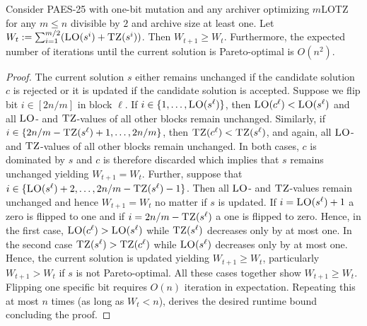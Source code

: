 \documentclass[
sigconf = false, %
review = false, %
screen = true, %
anonymous = true, %
format=acmsmall
]{acmart}
\newcommand{\mLOTZ}{\ensuremath{m}\text{-}\textsc{LOTZ}\xspace}
\newcommand{\LO}{\textsc{LO}\xspace}                      %
\newcommand{\TZ}{\textsc{TZ}\xspace}
\newcommand{\PAES}{PAES-25\xspace}
\newcommand{\nbc}[3]{
		{\colorbox{#3}{\bfseries\sffamily\scriptsize\textcolor{white}{#1}}}
		{\textcolor{#3}{\sf\small$\blacktriangleright$\textit{#2}$\blacktriangleleft$}}
}
\newcommand{\andre}[1]{\nbc{Andre}{#1}{red}}
\begin{document}
\begin{lemma}
    \label{lem:approach-Pareto-current-solution-plus-pareto}
    Consider \PAES with one-bit mutation and any archiver optimizing \mLOTZ for any $m \leq n$ divisible by $2$ and archive size at least one. Let $W_t:=\sum_{i=1}^{m/2} (\LO(s^i) + \TZ(s^i))$. Then $W_{t+1} \geq W_t$. Furthermore, the expected number of iterations until the current solution is Pareto-optimal is $O(n^2)$. 
\end{lemma}

\begin{proof}
    The current solution $s$ either remains unchanged if the candidate solution $c$ is rejected or it is updated if the candidate solution is accepted. Suppose we flip bit $i \in [2n/m]$ in block $\ell$. If $i \in \{1, \ldots , \LO(s^\ell)\}$, then $\LO(c^\ell) < \LO(s^\ell)$ and all $\LO$- and $\TZ$-values of all other blocks remain unchanged. Similarly, if $i \in \{2n/m-\TZ(s^\ell)+1, \ldots , 2n/m\}$, then $\TZ(c^\ell) < \TZ(s^\ell)$, and again, all $\LO$- and $\TZ$-values of all other blocks remain unchanged. In both cases, $c$ is dominated by $s$ and $c$ is therefore discarded which implies that $s$ remains unchanged yielding $W_{t+1}=W_t$. Further, suppose that $i \in \{\LO(s^\ell)+2, \ldots , 2n/m-\TZ(s^\ell)-1\}$. Then all $\LO$- and $\TZ$-values remain unchanged and hence $W_{t+1}=W_t$ no matter if $s$ is updated. If $i = \LO(s^\ell)+1$ a zero is flipped to one and if $i=2n/m-\TZ(s^\ell)$ a one is flipped to zero. Hence, in the first case, $\LO(c^{\ell}) > \LO(s^\ell)$ while $\TZ(s^\ell)$ decreases only by at most one. In the second case $\TZ(s^\ell)>\TZ(c^\ell)$ while $\LO(s^\ell)$ decreases only by at most one. Hence, the current solution is updated yielding $W_{t+1} \geq W_t$, particularly $W_{t+1} > W_t$ if $s$ is not Pareto-optimal. All these cases together show $W_{t+1} \geq W_t$. Flipping one specific bit requires $O(n)$ iteration in expectation. Repeating this at most $n$ times (as long as $W_t < n$), derives the desired runtime bound concluding the proof.
\end{proof}


\end{document}
